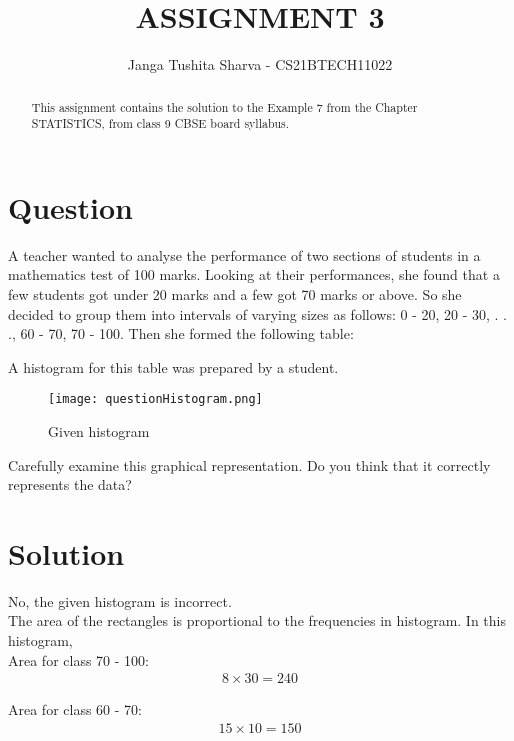 \documentclass[journal, 12pt, twocolumn]{IEEEtran}
\title{ASSIGNMENT 3}
\author{Janga Tushita Sharva - CS21BTECH11022}
\numberwithin{equation}{subsection}
\begin{document}
\maketitle

\begin{abstract}
This assignment contains the solution to the Example 7 from the Chapter STATISTICS, from class 9 CBSE board syllabus.
\end{abstract}


\section{Question}

A teacher wanted to analyse the performance of two sections of students
in a mathematics test of 100 marks. Looking at their performances, she found that a
few students got under 20 marks and a few got 70 marks or above. So she decided to
group them into intervals of varying sizes as follows: 0 - 20, 20 - 30, . . ., 60 - 70,
70 - 100. Then she formed the following table:

\begin{table}[ht!]
	
\end{table}

A histogram for this table was prepared by a student.

\begin{figure}[h!]
	\centering
	\texttt{[image: questionHistogram.png]}
	\caption{Given histogram}
	\label{Figure_1}
	\end{figure}

Carefully examine this graphical representation. Do you think that it correctly represents
the data?

\section{Solution}

No, the given histogram is incorrect.\\
The area of the rectangles is proportional to the frequencies in histogram. In this histogram,\\

Area for class 70 - 100:
\begin{align}
    8 \times 30 = 240
\end{align}

Area for class 60 - 70:
\begin{align}
    15 \times 10 = 150
\end{align}
\end{document}
